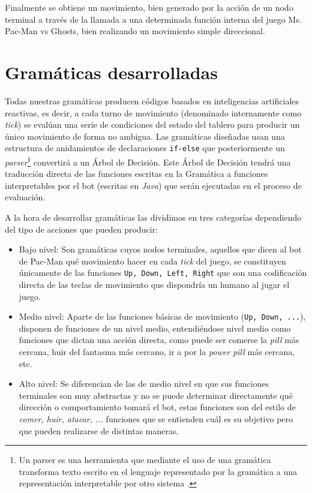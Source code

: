 Finalmente se obtiene un movimiento, bien generado por la acción de un nodo terminal a través de la llamada a una determinada función interna del juego Ms. Pac-Man vs Ghosts, bien realizando un movimiento simple direccional.

\section{Gramáticas desarrolladas}
Todas nuestras gramáticas producen códigos basados en inteligencias artificiales reactivas, es decir, a cada turno de movimiento (denominado internamente como \textit{tick}) se evalúan una serie de condiciones del estado del tablero para producir un único movimiento de forma no ambigua. Las gramáticas diseñadas usan una estructura de anidamientos de declaraciones \texttt{if-else} que posteriormente un \textit{parser}\footnote{Un parser es una herramienta que mediante el uso de una gramática transforma texto escrito en el lenguaje representado por la gramática a una representación interpretable por otro sistema \cite{parserTechopedia}.
} convertirá a un Árbol de Decisión. Este Árbol de Decisión tendrá una traducción directa de las funciones escritas en la Gramática a funciones interpretables por el bot (escritas en \textit{Java}) que serán ejecutadas en el proceso de evaluación.
 
A la hora de desarrollar gramáticas las dividimos en tres categorías dependiendo del tipo de acciones que pueden producir:
\begin{itemize}
\item Bajo nivel: Son gramáticas cuyos nodos terminales, aquellos que dicen al bot de Pac-Man qué movimiento hacer en cada \textit{tick} del juego, se constituyen únicamente de las funciones \texttt{Up, Down, Left, Right} que son una codificación directa de las teclas de movimiento que dispondría un humano al jugar el juego.

\item Medio nivel: Aparte de las funciones básicas de movimiento (\texttt{Up, Down, ...}), disponen de funciones de un nivel medio,  entendiéndose nivel medio como funciones que dictan una acción directa, como puede ser comerse la \textit{pill} más cercana, huir del fantasma más cercano, ir a por la \textit{power pill} más cercana, etc.

\item Alto nivel: Se diferencian de las de medio nivel en que sus funciones terminales son muy abstractas y no se puede determinar directamente qué dirección o comportamiento tomará el bot, estas funciones son del estilo de \textit{comer, huir, atacar, ...} funciones que se entienden cuál es su objetivo pero que pueden realizarse de distintas maneras.
\end{itemize}

